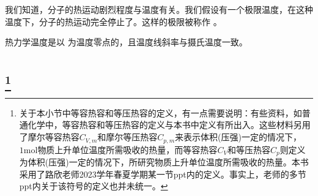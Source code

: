 我们知道，分子的热运动剧烈程度与温度有关。我们假设有一个极限温度，在这种温度下，分子的热运动完全停止了。这样的极限被称作 。

热力学温度是以  为温度零点的，且温度线斜率与摄氏温度一致。
\section[热力学第一定律]{}
\subsection[热与功]{\footnote{关于本小节中等容热容和等压热容的定义，有一点需要说明：有些资料，如普通化学中，等容热容和等压热容的定义与本书中定义有所出入。这些材料另用了摩尔等容热容$C_{V,m}$和摩尔等压热容$C_{p,m}$来表示体积(压强)一定的情况下，$1\mathrm{mol}$物质上升单位温度所需吸收的热量，而等容热容$C_V$和等压热容$C_p$则定义为体积(压强)一定的情况下，所研究物质上升单位温度所需吸收的热量。本书采用了路欣老师2023学年春夏学期某一节ppt内的定义。事实上，老师的多节ppt内关于该符号的定义也并未统一。}}
